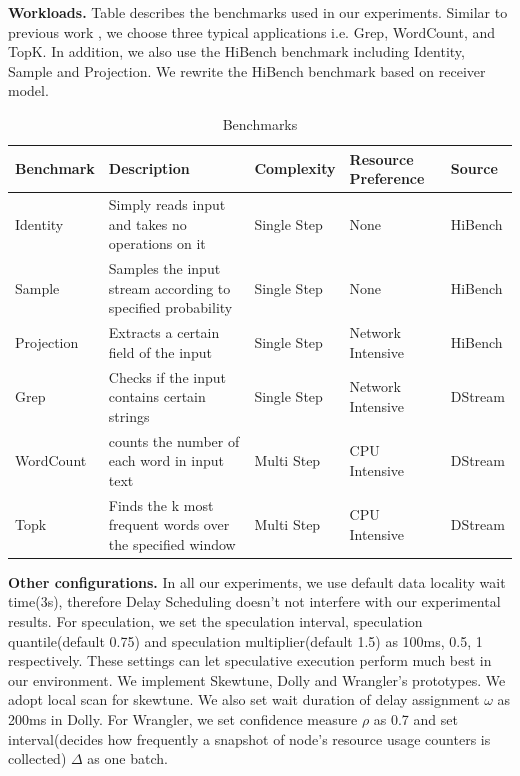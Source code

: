   \textbf{Workloads.} Table \uppercase\expandafter{} describes the benchmarks used in our experiments. Similar to previous work \cite{Zaharia2013}, we choose three typical applications i.e. Grep, WordCount, and TopK. In addition, we also use the HiBench \cite{HiBench} benchmark including Identity, Sample and Projection. We rewrite the HiBench \cite{HiBench} benchmark based on receiver model.
  \begin{table}[htbp]
    \footnotesize
    \centering
    \caption{Benchmarks}
    \begin{threeparttable}
    \centering
      \begin{tabular}{|p{1.4cm}|p{7.2cm}|p{1.5cm}|p{2.8cm}|p{1.7cm}|}
        \hline
        \centering
        \textbf{Benchmark} & \textbf{Description} & \textbf{Complexity} & \textbf{Resource Preference} & \textbf{Source} \\
        \hline
        Identity & Simply reads input and takes no operations on it & Single Step & None & HiBench \cite{HiBench} \\
        \hline
        Sample & Samples the input stream according to specified probability & Single Step & None & HiBench \cite{HiBench} \\
        \hline
        Projection & Extracts a certain field of the input & Single Step & Network Intensive & HiBench \cite{HiBench} \\
        \hline
        Grep & Checks if the input contains certain strings & Single Step & Network Intensive & DStream \cite{Zaharia2013} \\
        \hline
        WordCount & counts the number of each word in input text & Multi Step & CPU Intensive & DStream \cite{Zaharia2013} \\
        \hline
        Topk & Finds the k most frequent words over the specified window & Multi Step & CPU Intensive & DStream \cite{Zaharia2013} \\
        \hline
      \end{tabular}
    \end{threeparttable}
    \label{Table2}
  \end{table}

  \textbf{Other configurations.} In all our experiments, we use default data locality wait time(3s), therefore Delay Scheduling \cite{Zaharia2010B} doesn't not interfere with our experimental results. For speculation, we set the speculation interval, speculation quantile(default 0.75) and speculation multiplier(default 1.5) as 100ms, 0.5, 1 respectively. These settings can let speculative execution perform much best in our environment. We implement Skewtune, Dolly and Wrangler's prototypes. We adopt local scan for skewtune. We also set wait duration of delay assignment $\omega$ as 200ms in Dolly. For Wrangler, we set confidence measure $\rho$ as 0.7 and set interval(decides how frequently a snapshot of node's resource usage counters is collected) $\Delta$ as one batch.

